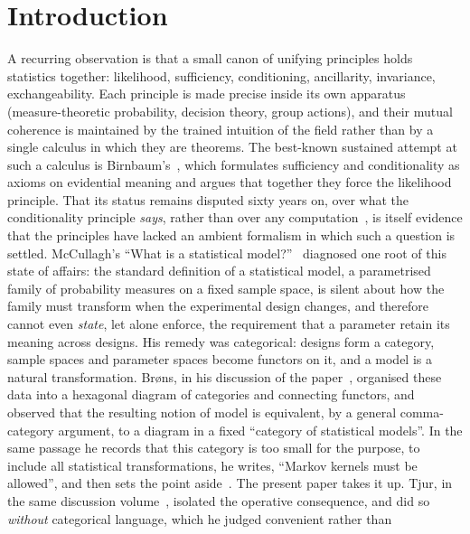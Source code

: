 \documentclass[11pt,a4paper]{article}
\theoremstyle{plain}
\theoremstyle{definition}
\theoremstyle{remark}
\begin{document}
\tableofcontents

\section{Introduction}

A recurring observation is that a small canon of unifying principles holds statistics together:
likelihood, sufficiency, conditioning, ancillarity, invariance,
exchangeability. Each principle is made precise inside its own apparatus
(measure-theoretic probability, decision theory, group actions), and their
mutual coherence is maintained by the trained intuition of the field rather
than by a single calculus in which they are theorems. The best-known sustained
attempt at such a calculus is Birnbaum's~\cite{birnbaum_foundations_1962}, which
formulates sufficiency and conditionality as axioms on evidential meaning and
argues that together they force the likelihood principle. That its status
remains disputed sixty years on, over what the conditionality principle
\emph{says}, rather than over any computation~\cite{mayo_birnbaum_2014,
evans_birnbaum_2013}, is itself evidence that the principles have lacked an
ambient formalism in which such a question is settled. McCullagh's ``What is a
statistical model?''~\cite{mccullagh_what_2002} diagnosed one root of this state of
affairs: the standard definition of a statistical model, a parametrised family
of probability measures on a fixed sample space, is silent about how the family
must transform when the experimental design changes, and therefore cannot even
\emph{state}, let alone enforce, the requirement that a parameter retain
its meaning across designs. His remedy was categorical: designs form a
category, sample spaces and parameter spaces become functors on it, and a model
is a natural transformation. Br\o ns, in his discussion of the
paper~\cite[pp.~1280--1282]{brons_discussion_2002}, organised these data into a
hexagonal diagram of categories and connecting functors, and observed that the resulting notion of
model is equivalent, by a general comma-category argument, to a diagram in a
fixed ``category of statistical models''. In the same passage he records that
this category is too small for the purpose, to include all statistical
transformations, he writes, ``Markov kernels must be allowed'', and then
sets the point aside~\cite[p.~1282]{brons_discussion_2002}. The present paper
takes it up. Tjur, in the same discussion
volume~\cite{tjur_discussion_2002}, isolated the operative consequence, and did so
\emph{without} categorical language, which he judged convenient rather than
\end{document}
